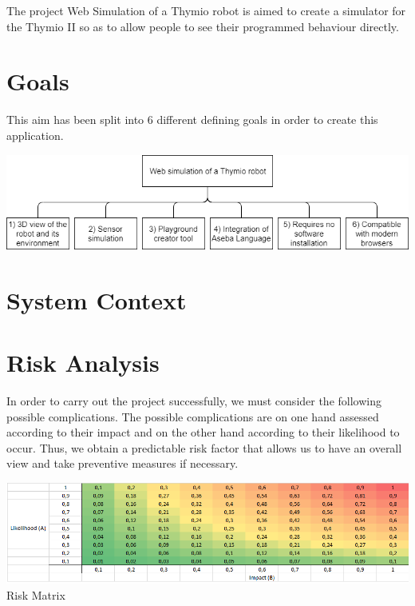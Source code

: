 \documentclass{scrbook}
\begin{document}
The project Web Simulation of a Thymio robot is aimed to create a simulator for the Thymio II so as to allow people to see their programmed behaviour directly.

\section{Goals}

This aim has been split into 6 different defining goals in order to create this application.
\begin{center}
  \includegraphics[width=\textwidth]{./goals}
\end{center}

\section{System Context}
\section{Risk Analysis}
In order to carry out the project successfully, we must consider the following possible complications. The possible complications are on one hand assessed according to their impact and on the other hand according to their likelihood to occur. 
Thus, we obtain a predictable risk factor that allows us to have an overall view and take preventive measures if necessary.

\begin{center}
  \includegraphics[width=\textwidth]{./risk-matrix}\\
  Risk Matrix
\end{center}
\end{document}
